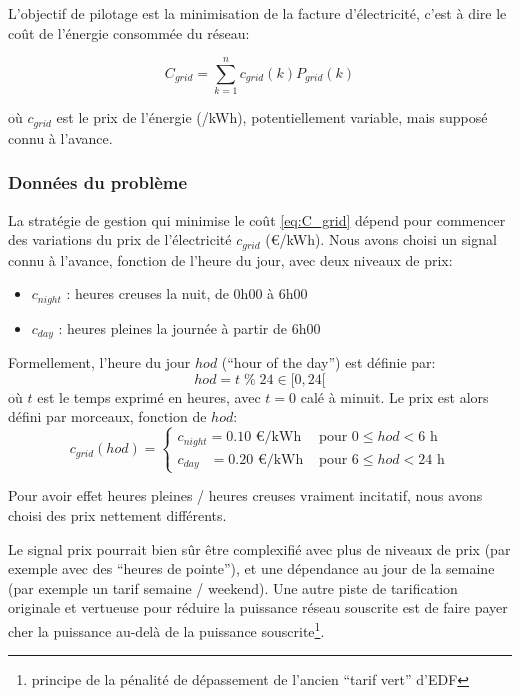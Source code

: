 \documentclass[a4paper,10pt,twocolumn]{article}
\begin{document}
L'objectif de pilotage est la minimisation de la facture d'électricité,
c'est à dire le coût de l'énergie consommée du réseau:

\begin{equation} \label{eq:C_grid}
  C_{grid} = \sum_{k=1}^{n} c_{grid}(k)P_{grid}(k)
\end{equation}

où $c_{grid}$ est le prix de l'énergie (\texteuro/kWh), potentiellement variable,
mais supposé connu à l'avance.

\subsubsection{Données du problème}
\label{sss:fixed_var}

La stratégie de gestion qui minimise le coût \eqref{eq:C_grid}
dépend pour commencer des variations du prix de l'électricité $c_{grid}$ (€/kWh).
Nous avons choisi un signal connu à l'avance, fonction de l'heure du jour,
avec deux niveaux de prix:
\begin{itemize}
 \item $c_{night}$ : heures creuses la nuit, de 0h00 à 6h00
 \item $c_{day}$ : heures pleines la journée à partir de 6h00
\end{itemize}

Formellement, l'heure du jour $hod$ (``hour of the day'') est définie par:
%
\begin{equation} \label{eq:hod}
  hod = t \; \% \; 24 \in [0, 24[
\end{equation} 
où $t$ est le temps exprimé en heures, avec $t=0$ calé à minuit.
Le prix est alors défini par morceaux, fonction de $hod$:
\begin{equation}
  c_{grid}(hod) = \begin{cases}
    c_{night} = 0.10 \text{ €/kWh} & \text{ pour } 0 \leq hod < 6\text{ h}\\
    c_{day} \;\;\,  = 0.20 \text{ €/kWh} & \text{ pour } 6 \leq hod < 24\text{ h}
  \end{cases}
\end{equation}

Pour avoir effet heures pleines / heures creuses vraiment incitatif,
nous avons choisi des prix nettement différents.

Le signal prix pourrait bien sûr être complexifié avec plus de niveaux de prix
(par exemple avec des ``heures de pointe''), et une dépendance au jour de la semaine
(par exemple un tarif semaine / weekend).
Une autre piste de tarification originale et vertueuse pour réduire la puissance réseau souscrite
est de faire payer cher la puissance au-delà de la puissance souscrite\footnote{
  principe de la pénalité de dépassement de l'ancien ``tarif vert'' d'EDF}.
\end{document}
